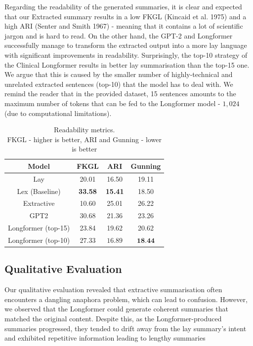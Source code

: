 \documentclass[
]{article}
\begin{document}
Regarding the readability of the generated summaries, it is clear and
expected that our Extracted summary results in a low FKGL (Kincaid et
al. 1975) and a high ARI (Senter and Smith 1967) - meaning that it
contains a lot of scientific jargon and is hard to read. On the other
hand, the GPT-2 and Longformer successfully manage to transform the
extracted output into a more lay language with significant improvements
in readability. Surprisingly, the top-10 strategy of the Clinical
Longformer results in better lay summarisation than the top-15 one. We
argue that this is caused by the smaller number of highly-technical and
unrelated extracted sentences (top-10) that the model has to deal with.
We remind the reader that in the provided dataset, 15 sentences amounts
to the maximum number of tokens that can be fed to the Longformer model
- \(1,024\) (due to computational limitations).

\begin{table}[htbp]
    \centering
    \begin{tabular}{|c|c|c|c|}
        \hline
        \textbf{Model} & \textbf{FKGL} & \textbf{ARI} & \textbf{Gunning} \\
        \hline
            Lay & 20.01 & 16.50 & 19.11 \\
        \hline
            Lex (Baseline) & \textbf{33.58} & \textbf{15.41} & 18.50 \\
        \hline
            Extractive & 10.60 & 25.01 & 26.22 \\
        \hline
            GPT2 & 30.68 & 21.36 & 23.26 \\
        \hline
            Longformer (top-15) & 23.84 & 19.62 & 20.62 \\
        \hline
            Longformer (top-10) & $27.33$ & $16.89$ & $\textbf{18.44}$ \\
        \hline
    \end{tabular}
    \caption{Readability metrics. \\ FKGL - higher is better, ARI and Gunning - lower is better}\label{tab:dataset_stats}
\end{table}

\hypertarget{sec:evaluation-qualitative}{%
\subsection{Qualitative Evaluation}\label{sec:evaluation-qualitative}}

Our qualitative evaluation revealed that extractive summarisation often
encounters a dangling anaphora problem, which can lead to confusion.
However, we observed that the Longformer could generate coherent
summaries that matched the original content. Despite this, as the
Longformer-produced summaries progressed, they tended to drift away from
the lay summary's intent and exhibited repetitive information leading to
lengthy summaries
\end{document}
